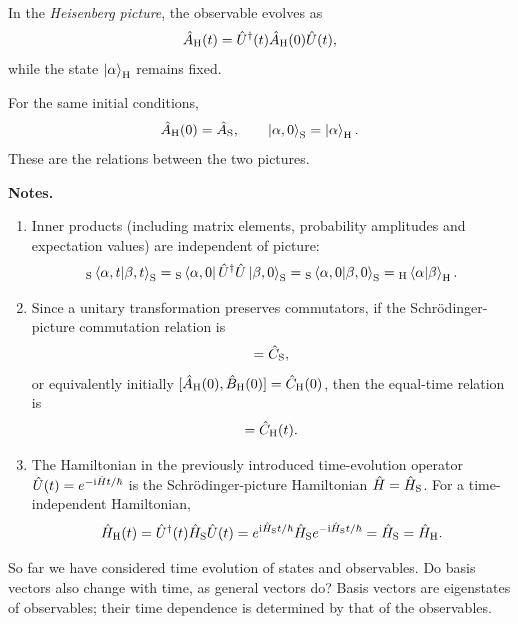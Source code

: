 In the \emph{Heisenberg picture}, the observable evolves as
\begin{equation}
\hat{A}_{\mathrm H}(t)=\hat{U}^{\dagger}(t)\hat{A}_{\mathrm H}(0)\hat{U}(t),
\end{equation}
while the state $\left|\alpha\right\rangle_{\mathrm H}$ remains fixed.

For the same initial conditions,
\begin{equation}
\hat{A}_{\mathrm H}(0)=\hat{A}_{\mathrm S},\qquad
\left|\alpha,0\right\rangle_{\mathrm S}=\left|\alpha\right\rangle_{\mathrm H}.
\end{equation}
These are the relations between the two pictures.

\textbf{Notes.}
\begin{enumerate}
\item Inner products (including matrix elements, probability amplitudes and expectation values) are independent of picture:
\begin{equation}
{}_{\mathrm S}\left\langle\alpha,t\middle|\beta,t\right\rangle_{\mathrm S}
={}_{\mathrm S}\left\langle\alpha,0\right|\hat{U}^{\dagger}\hat{U}\left|\beta,0\right\rangle_{\mathrm S}
={}_{\mathrm S}\left\langle\alpha,0\middle|\beta,0\right\rangle_{\mathrm S}
={}_{\mathrm H}\left\langle\alpha\middle|\beta\right\rangle_{\mathrm H}.
\end{equation}
\item Since a unitary transformation preserves commutators, if the Schr\"odinger-picture commutation relation is
\begin{equation}
[\op A_{\mathrm S},\op B_{\mathrm S}]=\op C_{\mathrm S},
\end{equation}
or equivalently initially $[\hat{A}_{\mathrm H}(0),\hat{B}_{\mathrm H}(0)]=\hat{C}_{\mathrm H}(0)$, then the equal-time relation is
\begin{equation}
[\op A_{\mathrm H}(t),\op B_{\mathrm H}(t)]=\op C_{\mathrm H}(t).
\end{equation}
\item The Hamiltonian in the previously introduced time-evolution operator $\hat{U}(t)=e^{-\mathrm{i}\hat{H}t/\hbar}$ is the Schr\"odinger-picture Hamiltonian $\hat{H}=\hat{H}_{\mathrm S}$. For a time-independent Hamiltonian,
\begin{equation}
\hat{H}_{\mathrm H}(t)=\hat{U}^{\dagger}(t)\hat{H}_{\mathrm S}\hat{U}(t)
=e^{\mathrm{i}\hat{H}_{\mathrm S}t/\hbar}\hat{H}_{\mathrm S}e^{-\mathrm{i}\hat{H}_{\mathrm S}t/\hbar}
=\hat{H}_{\mathrm S}=\hat{H}_{\mathrm H}.
\end{equation}
\end{enumerate}
So far we have considered time evolution of states and observables. Do basis vectors also change with time, as general vectors do? Basis vectors are eigenstates of observables; their time dependence is determined by that of the observables.

